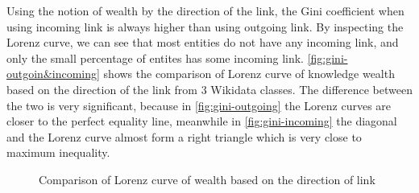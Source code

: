 Using the notion of wealth by the direction of the link, the Gini coefficient when using incoming link is always higher than using outgoing link. By inspecting the Lorenz curve, we can see that most entities do not have any incoming link, and only the small percentage of entites has some incoming link. \autoref{fig:gini-outgoin&incoming} shows the comparison of Lorenz curve of knowledge wealth based on the direction of the link from 3 Wikidata classes. The difference between the two is very significant, because in \autoref{fig:gini-outgoing} the Lorenz curves are closer to the perfect equality line, meanwhile in \autoref{fig:gini-incoming} the diagonal and the Lorenz curve almost form a right triangle which is very close to maximum inequality.


\begin{figure}[!htbp]
    \centering 
    
    
    \caption{Comparison of Lorenz curve of wealth based on the direction of link} \label{fig:gini-outgoin&incoming}
    
\end{figure}

